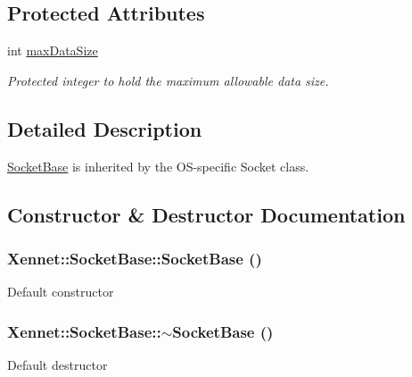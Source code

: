 \subsection*{Protected Attributes}
\begin{CompactItemize}
\item 
int \hyperlink{classXennet_1_1SocketBase_32530d6e56d4aff4696a76f9588b5f07}{maxDataSize}
\begin{CompactList}\small\item\em Protected integer to hold the maximum allowable data size. \item\end{CompactList}\end{CompactItemize}


\subsection{Detailed Description}
\hyperlink{classXennet_1_1SocketBase}{SocketBase} is inherited by the OS-specific Socket class. 

\subsection{Constructor \& Destructor Documentation}
\hypertarget{classXennet_1_1SocketBase_de4341bc034247a1ef5620914613ebbc}{
\subsubsection{\setlength{\rightskip}{0pt plus 5cm}Xennet::SocketBase::SocketBase ()}}
\label{classXennet_1_1SocketBase_de4341bc034247a1ef5620914613ebbc}


Default constructor \hypertarget{classXennet_1_1SocketBase_7bd3b275e3e62943c9220e56b17e146a}{
\subsubsection{\setlength{\rightskip}{0pt plus 5cm}Xennet::SocketBase::$\sim$SocketBase ()}}
\label{classXennet_1_1SocketBase_7bd3b275e3e62943c9220e56b17e146a}


Default destructor 

